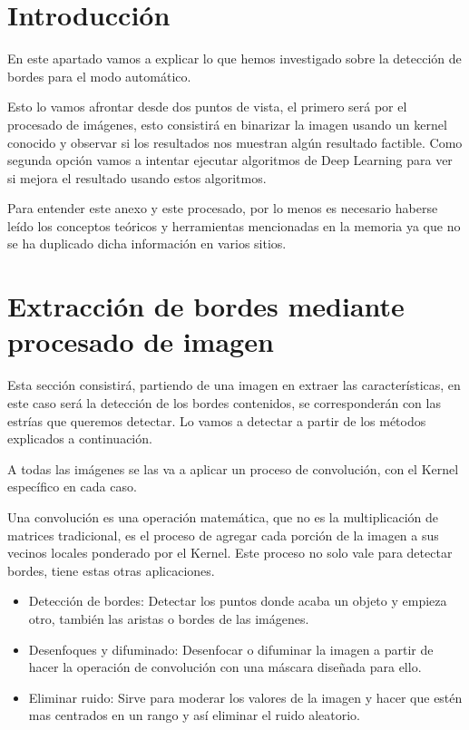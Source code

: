 \label{anexo:F}
\section{Introducción}
En este apartado vamos a explicar lo que hemos investigado sobre la detección de bordes para el modo automático.

Esto lo vamos afrontar desde dos puntos de vista, el primero será por el procesado de imágenes, esto consistirá en binarizar la imagen usando un kernel conocido y observar si los resultados nos muestran algún resultado factible.
Como segunda opción vamos a intentar ejecutar algoritmos de Deep Learning para ver si mejora el resultado usando estos algoritmos.

Para entender este anexo y este procesado, por lo menos es necesario haberse leído los conceptos teóricos y herramientas mencionadas en la memoria ya que no se ha duplicado dicha información en varios sitios.

\section{Extracción de bordes mediante procesado de imagen}
Esta sección consistirá, partiendo de una imagen en extraer las características, en este caso será la detección de los bordes contenidos, se corresponderán con las estrías que queremos detectar. Lo vamos a detectar a partir de los métodos explicados a continuación. 

A todas las imágenes se las va a aplicar un proceso de convolución, con el Kernel \cite{wiki:kernels} específico en cada caso.

Una convolución es una operación matemática, que no es la multiplicación de matrices tradicional, es el proceso de agregar cada porción de la imagen a sus vecinos locales ponderado por el Kernel. 
Este proceso no solo vale para detectar bordes, tiene estas otras aplicaciones.
\begin{itemize}
\item Detección de bordes: Detectar los puntos donde acaba un objeto y empieza otro, también las aristas o bordes de las imágenes.
\item Desenfoques y difuminado: Desenfocar o difuminar la imagen a partir de hacer la operación de convolución con una máscara diseñada para ello.
\item Eliminar ruido: Sirve para moderar los valores de la imagen  y hacer que estén mas centrados en un rango y así eliminar el ruido aleatorio. 
\end{itemize}

